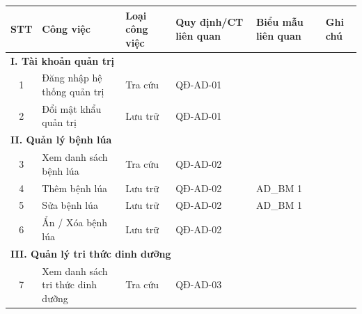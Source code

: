 \documentclass[12pt,a4paper]{article}
\begin{document}
\begin{longtable}{|
        c|
        >{\raggedright\arraybackslash}p{3.2cm}|
        >{\raggedright\arraybackslash}p{2.2cm}|
        >{\raggedright\arraybackslash}p{2.4cm}|
        >{\raggedright\arraybackslash}p{2.6cm}|
        >{\raggedright\arraybackslash}p{2.6cm}|}
    \hline
    \rowcolor{headerblue}
    \textbf{STT} & \textbf{Công việc}               & \textbf{Loại công việc} & \textbf{Quy định/CT liên quan} & \textbf{Biểu mẫu liên quan} & \textbf{Ghi chú} \\
    \hline
    \endhead
    \multicolumn{6}{|l|}{\cellcolor{notegreen}\textbf{I. Tài khoản quản trị}}                                                                                     \\
    \hline
    1            & Đăng nhập hệ thống quản trị      & Tra cứu                 & QĐ-AD-01                       &                             &                  \\
    \hline
    2            & Đổi mật khẩu quản trị            & Lưu trữ                 & QĐ-AD-01                       &                             &                  \\
    \hline
    \multicolumn{6}{|l|}{\cellcolor{notegreen}\textbf{II. Quản lý bệnh lúa}}                                                                                      \\
    \hline
    3            & Xem danh sách bệnh lúa           & Tra cứu                 & QĐ-AD-02                       &                             &                  \\
    \hline
    4            & Thêm bệnh lúa                    & Lưu trữ                 & QĐ-AD-02                       & AD\_BM 1                    &                  \\
    \hline
    5            & Sửa bệnh lúa                     & Lưu trữ                 & QĐ-AD-02                       & AD\_BM 1                    &                  \\
    \hline
    6            & Ẩn / Xóa bệnh lúa                & Lưu trữ                 & QĐ-AD-02                       &                             &                  \\
    \hline
    \multicolumn{6}{|l|}{\cellcolor{notegreen}\textbf{III. Quản lý tri thức dinh dưỡng}}                                                                          \\
    \hline
    7            & Xem danh sách tri thức dinh dưỡng & Tra cứu                & QĐ-AD-03                       &                             &                  \\

\end{longtable}
\end{document}
